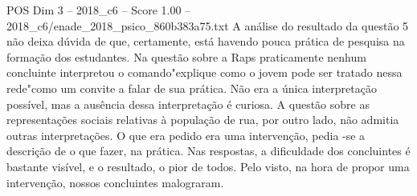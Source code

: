 \begin{textsample}{POS Dim 3 – 2018\_c6 – Score 1.00 – 2018\_c6/enade\_2018\_psico\_860b383a75.txt}
A análise do resultado da questão 5 não deixa dúvida de que, certamente, está havendo pouca prática de pesquisa na formação dos estudantes.
Na questão sobre a Raps praticamente nenhum concluinte interpretou o comando"explique como o jovem pode ser tratado nessa rede"como um convite a falar de sua prática.
Não era a única interpretação possível, mas a ausência dessa interpretação é curiosa.
A questão sobre as representações sociais relativas à população de rua, por outro lado, não admitia outras interpretações.
O que era pedido era uma intervenção, pedia -se a descrição de o que fazer, na prática.
Nas respostas, a dificuldade dos concluintes é bastante visível, e o resultado, o pior de todos.
Pelo visto, na hora de propor uma intervenção, nossos concluintes malograram.

\end{textsample}
